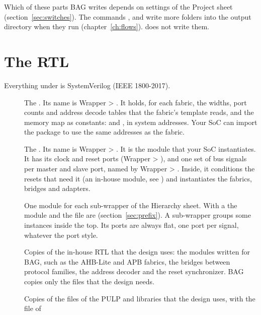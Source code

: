 Which of these parts BAG writes depends on settings of the Project sheet
(section~\ref{sec:switches}). The commands ,  and
 write more folders into the output directory when they run
(chapter~\ref{ch:flows}).  does not write them.

\section{The RTL}
\label{sec:rtl}

Everything under  is SystemVerilog (IEEE 1800-2017).

\begin{description}
\item[] The . Its name is Wrapper >
  . It holds, for each fabric, the widths, port counts and
  address decode tables that the fabric's template reads, and the memory map as
  constants:  and , in system
  addresses. Your SoC can import the package to use the same addresses as the fabric.
\item[] The . Its name is Wrapper >
  . It is the module that your SoC instantiates. It has its
  clock and reset ports (Wrapper > ), and one set of bus
  signals per master and slave port, named by Wrapper > .
  Inside, it conditions the resets that need it (an in-house  module, see
  ) and instantiates the fabrics, bridges and adapters.
\item[] One module for each sub-wrapper of the Hierarchy
  sheet. With a  the module and the file are 
  (section~\ref{sec:prefix}). A sub-wrapper groups some instances inside the top. Its ports are always flat,
  one port per signal, whatever the port style.
\item[] Copies of the in-house RTL that the design uses: the modules
  written for BAG, such as the AHB-Lite and APB fabrics, the bridges between protocol
  families, the address decoder and the reset synchronizer. BAG copies only the files
  that the design needs.
\item[] Copies of the files of the PULP  and
   libraries that the design uses, with the  file of

\end{description}

